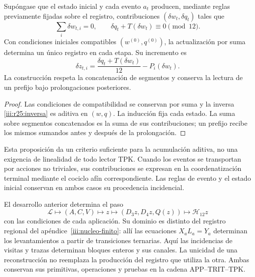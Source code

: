\begin{proposition}
\label{iii:r25:eventos}
Supóngase que el estado inicial y cada evento $a_t$ producen,
mediante reglas previamente fijadas sobre el registro, contribuciones
$(\delta w_t,\delta q_t)$ tales que
\[
 \sum_i\delta w_{t,i}=0,
 \qquad \delta q_t+T(\delta w_t)\equiv0\pmod {12}.
\]
Con condiciones iniciales compatibles $(w^{(0)},q^{(0)})$,
la actualización por suma determina un único registro en cada etapa.
Su incremento es
\[
 \delta z_{t,i}=
 \frac{\delta q_t+T(\delta w_t)}{12}-P_i(\delta w_t).
\]
La construcción respeta la concatenación de segmentos y conserva
la lectura de un prefijo bajo prolongaciones posteriores.
\end{proposition}
\begin{proof}
Las condiciones de compatibilidad se conservan por suma y la
inversa \eqref{iii:r25:inversa} es aditiva en $(w,q)$.
La inducción fija cada estado. La suma sobre segmentos concatenados
es la suma de sus contribuciones; un prefijo recibe los mismos
sumandos antes y después de la prolongación.
\end{proof}

Esta proposición da un criterio suficiente para la acumulación
aditiva, no una exigencia de linealidad de todo lector TPK.
Cuando los eventos se transportan por acciones no triviales, sus
contribuciones se expresan en la coordenatización terminal mediante el cociclo
afín correspondiente. Las reglas de evento y el estado inicial
conservan en ambos casos su procedencia incidencial.

El desarrollo anterior determina el paso
\[
 \mathscr L\longmapsto(A,C,V)\longmapsto z
 \longmapsto(D_3z,D_4z,Q(z))\longmapsto\mathcal H_{12}z
\]
con las condiciones de cada aplicación. Su dominio es distinto del
registro regional del apéndice~\ref{iii:nucleo-finito}: allí las
ecuaciones $X_aL_a=Y_a$ determinan los levantamientos a partir de
transiciones ternarias. Aquí las incidencias de visitas y trazas
determinan bloques enteros y sus canales. La unicidad de una
reconstrucción no reemplaza la producción del registro que utiliza
la otra. Ambas conservan sus primitivas, operaciones y pruebas en
la cadena APP--TRIT--TPK.
